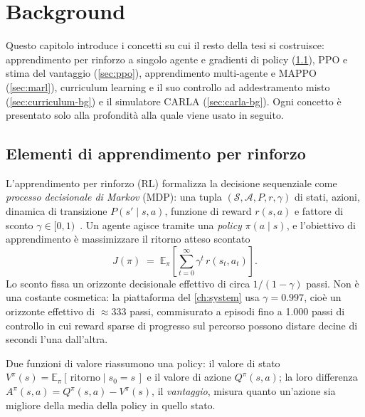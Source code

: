 \chapter{Background}
\label{ch:background}

Questo capitolo introduce i concetti su cui il resto della tesi si
costruisce: apprendimento per rinforzo a singolo agente e gradienti di
policy (\cref{sec:rl-essentials}), PPO e stima del vantaggio
(\cref{sec:ppo}), apprendimento multi-agente e MAPPO (\cref{sec:marl}),
curriculum learning e il suo controllo ad addestramento misto
(\cref{sec:curriculum-bg}) e il simulatore CARLA
(\cref{sec:carla-bg}). Ogni concetto è presentato solo alla profondità
alla quale viene usato in seguito.

\section{Elementi di apprendimento per rinforzo}
\label{sec:rl-essentials}

L'apprendimento per rinforzo (RL) formalizza la decisione sequenziale
come \emph{processo decisionale di Markov} (MDP): una tupla
$(\mathcal{S}, \mathcal{A}, P, r, \gamma)$ di stati, azioni, dinamica di
transizione $P(s' \mid s, a)$, funzione di reward $r(s, a)$ e fattore di
sconto $\gamma \in [0, 1)$~\cite{sutton2018rl}. Un agente agisce tramite
una \emph{policy} $\pi(a \mid s)$, e l'obiettivo di apprendimento è
massimizzare il ritorno atteso scontato
\begin{equation}
  J(\pi) \;=\; \mathbb{E}_{\pi}\!\left[\sum_{t=0}^{\infty} \gamma^{t}\,
  r(s_t, a_t)\right].
\end{equation}
Lo sconto fissa un orizzonte decisionale effettivo di circa
$1/(1-\gamma)$ passi. Non è una costante cosmetica: la piattaforma del
\cref{ch:system} usa $\gamma = 0.997$, cioè un orizzonte effettivo di
$\approx 333$ passi, commisurato a episodi fino a 1{.}000 passi di
controllo in cui reward sparse di progresso sul percorso possono
distare decine di secondi l'una dall'altra.

Due funzioni di valore riassumono una policy: il valore di stato
$V^{\pi}(s) = \mathbb{E}_{\pi}[\,\text{ritorno} \mid s_0 = s\,]$ e il
valore di azione $Q^{\pi}(s, a)$; la loro differenza
$A^{\pi}(s, a) = Q^{\pi}(s, a) - V^{\pi}(s)$, il \emph{vantaggio},
misura quanto un'azione sia migliore della media della policy in quello
stato.

